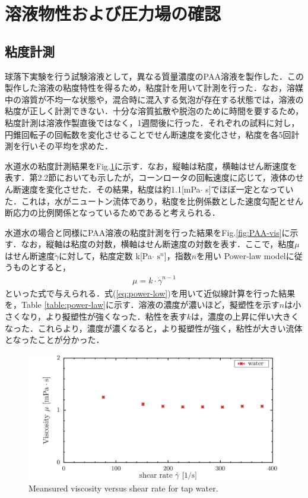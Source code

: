 \section{溶液物性および圧力場の確認}
\subsection{粘度計測}
球落下実験を行う試験溶液として，異なる質量濃度のPAA溶液を製作した．この製作した溶液の粘度特性を得るため，粘度計を用いて計測を行った．なお，溶媒中の溶質が不均一な状態や，混合時に混入する気泡が存在する状態では，溶液の粘度が正しく計測できない．十分な溶質拡散や脱泡のために時間を要するため，粘度計測は溶液作製直後ではなく，1週間後に行った．それぞれの試料に対し，円錐回転子の回転数を変化させることでせん断速度を変化させ，粘度を各5回計測を行いその平均を求めた．

水道水の粘度計測結果をFig.\ref{fig:water-vis}に示す．なお，縦軸は粘度，横軸はせん断速度を表す．第2.2節においても示したが，コーンロータの回転速度に応じて，液体のせん断速度を変化させた．その結果，粘度は約1.1[mPa$\cdot$ s]でほぼ一定となっていた．これは，水がニュートン流体であり，粘度を比例係数とした速度勾配とせん断応力の比例関係となっているためであると考えられる．

水道水の場合と同様にPAA溶液の粘度計測を行った結果をFig.\ref{fig:PAA-vis}に示す．なお，縦軸は粘度の対数，横軸はせん断速度の対数を表す．ここで，粘度$\mu$はせん断速度$\dot{\gamma}$に対して，粘度定数 k[Pa$\cdot$ $\text{s}^n$]，指数$n$を用い Power-law modelに従うものとすると，
\begin{eqnarray}
	\label{eq:power-low}
	\mu=k\cdot\dot{\gamma}^{n-1}
\end{eqnarray}
といった式で与えられる\cite{ref:1}．式(\ref{eq:power-low})を用いて近似線計算を行った結果を，Table \ref{table:power-law}に示す．溶液の濃度が濃いほど，擬塑性を示す$n$は小さくなり，より擬塑性が強くなった．粘性を表す$k$は，濃度の上昇に伴い大きくなった．これらより，濃度が濃くなると，より擬塑性が強く，粘性が大きい流体となったことが分かった．

\begin{figure}[ht]
	\centering
	\includegraphics[width=12cm,clip]{4-Results/water.png}
	\caption{Meansured viscosity versus shear rate for tap water.}
	\label{fig:water-vis}
\end{figure}

